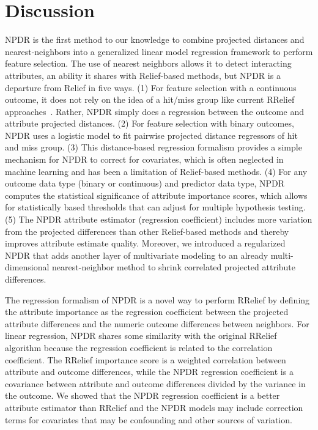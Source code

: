 \documentclass[10pt]{article}
\begin{document}
\section{Discussion}
NPDR is the first method to our knowledge to combine projected distances and nearest-neighbors into a generalized linear model regression framework to perform feature selection. The use of nearest neighbors allows it to detect interacting attributes, an ability it shares with Relief-based methods, but NPDR is a departure from Relief in five ways. (1) For feature selection with a continuous outcome, it does not rely on the idea of a hit/miss group like current RRelief approaches~\cite{urbanowicz17}. Rather, NPDR simply does a regression between the outcome and attribute projected distances. (2) For feature selection with binary outcomes, NPDR uses a logistic model to fit pairwise projected distance regressors of hit and miss group. (3) This distance-based regression formalism provides a simple mechanism for NPDR to correct for covariates, which is often neglected in machine learning and has been a limitation of Relief-based methods. (4) For any outcome data type (binary or continuous) and predictor data type, NPDR computes the statistical significance of attribute importance scores, which allows for statistically based thresholds that can adjust for multiple hypothesis testing. (5) The NPDR attribute estimator (regression coefficient) includes more variation from the projected differences than other Relief-based methods and thereby improves attribute estimate quality. Moreover, we introduced a regularized NPDR that adds another layer of multivariate modeling to an already multi-dimensional nearest-neighbor method to shrink correlated projected attribute differences.  

The regression formalism of NPDR is a novel way to perform RRelief by defining the attribute importance as the regression coefficient between the projected attribute differences and the numeric outcome differences between neighbors.  For linear regression, NPDR shares some similarity with the original RRelief algorithm because the regression coefficient is related to the correlation coefficient. The RRelief importance score is a weighted correlation between attribute and outcome differences, while the NPDR regression coefficient is a covariance between attribute and outcome differences divided by the variance in the outcome. We showed that the NPDR regression coefficient is a better attribute estimator than RRelief and the NPDR models may include correction terms for covariates that may be confounding and other sources of variation. 
\end{document}
